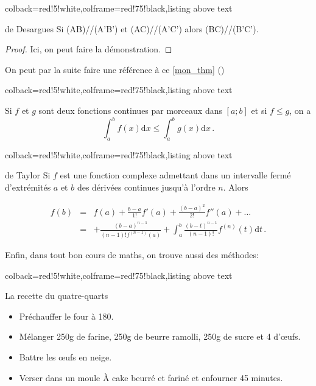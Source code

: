 \begin{lesson}
\begin{tcblisting}{colback=red!5!white,colframe=red!75!black,listing above text}
\begin{theorem}{de Desargues}
Si (AB)//(A'B') et (AC)//(A'C') alors (BC)//(B'C').
\end{theorem}

\begin{proof}
Ici, on peut faire la démonstration.
\end{proof}

On peut par la suite faire une référence à ce \cref{mon_thm} ()
\end{tcblisting}


 \begin{tcblisting}{colback=red!5!white,colframe=red!75!black,listing above text}
\begin{property}{}
Si $f$ et $g$ sont deux fonctions continues par morceaux dans $[a;b]$
et si $f \leqslant g$, on a \[\int_a^b f(x) \text{d}x \leqslant \int_a^b g(x) \text{d}x  \,. \]
\end{property}
\end{tcblisting}


 \begin{tcblisting}{colback=red!5!white,colframe=red!75!black,listing above text}
\begin{formula}{de Taylor}
Si $f$ est une fonction complexe admettant dans un intervalle fermé d'extrémités $a$ et $b$ des  dérivées continues jusqu'à l'ordre $n$. Alors

\[
\begin{array}{rcl}
f(b) & = & f(a)+\frac{b-a}{1!}f'(a)+\frac{(b-a)^2}{2!}f''(a)+\ldots \\
& = & +\frac{(b-a)^{n-1}}{(n-1)! f^{(n-1)}(a)}+ \int_a^b \frac{(b-t)^{n-1}}{(n-1)!}f^{(n)}(t) \text{d}t \,.
\end{array}
\] 

\end{formula}
\end{tcblisting}


Enfin, dans tout bon cours de maths, on trouve aussi des méthodes:

 \begin{tcblisting}{colback=red!5!white,colframe=red!75!black,listing above text}
\begin{method}[quart]{La recette du quatre-quarts}

\begin{itemize}
\item Préchauffer le four à 180\degree.
\item Mélanger 250g de farine, 250g de beurre ramolli, 250g de sucre et 4 d'œufs.
\item Battre les œufs en neige.
\item Verser dans un moule À cake beurré et fariné et enfourner 45 minutes.
\end{itemize}
\end{method}



\end{tcblisting}
\end{lesson}
